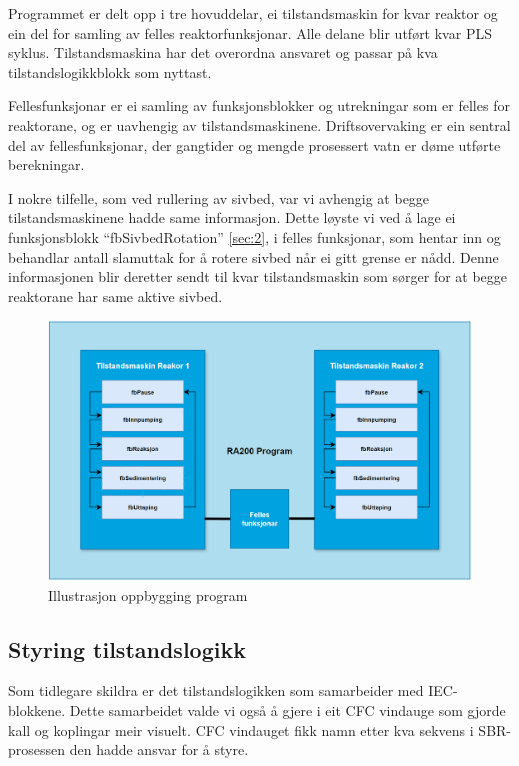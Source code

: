 Programmet er delt opp i tre hovuddelar, ei tilstandsmaskin for kvar reaktor og ein del for samling av felles reaktorfunksjonar.
Alle delane blir utført kvar \gls{PLS} syklus. 
Tilstandsmaskina har det overordna ansvaret og passar på kva tilstandslogikkblokk som nyttast.

Fellesfunksjonar er ei samling av funksjonsblokker og utrekningar som er felles for reaktorane, og er uavhengig av tilstandsmaskinene.
Driftsovervaking er ein sentral del av fellesfunksjonar, der gangtider og mengde prosessert vatn er døme utførte berekningar.

I nokre tilfelle, som ved rullering av sivbed, var vi avhengig at begge tilstandsmaskinene hadde same informasjon.
Dette løyste vi ved å lage ei funksjonsblokk ``fbSivbedRotation'' \ref{sec:2}, i felles funksjonar, som hentar inn og behandlar antall slamuttak for å rotere sivbed når ei gitt grense er nådd.
Denne informasjonen blir deretter sendt til kvar tilstandsmaskin som sørger for at begge reaktorane har same aktive sivbed.

\begin{figure}[htbp]
    \centering
    \includegraphics[width=1\textwidth]{Figurar/Oppbygging_Program.png}
    \caption{Illustrasjon oppbygging program}\label{fig:OppbyggingProgram}
\end{figure}

\newpage

\subsection{Styring tilstandslogikk}

Som tidlegare skildra er det tilstandslogikken som samarbeider med \gls{IEC}-blokkene. Dette samarbeidet valde vi også å gjere i eit
\gls{CFC} vindauge som gjorde kall og koplingar meir visuelt. \gls{CFC} vindauget fikk namn etter kva sekvens i \gls{SBR}-prosessen
den hadde ansvar for å styre. 

